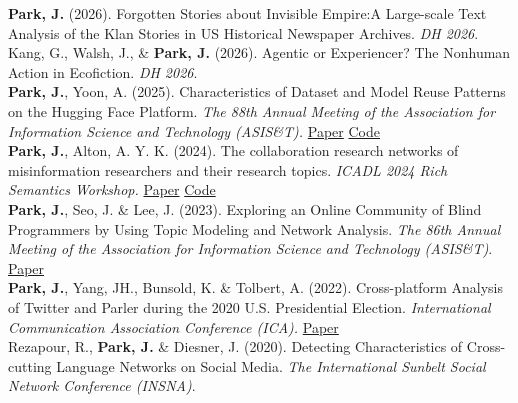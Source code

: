 \documentclass{article}
\begin{document}
\noindent \textbf{Park, J.} (2026). Forgotten Stories about Invisible Empire:A Large-scale Text Analysis of the Klan Stories in US Historical Newspaper Archives. \textit{DH 2026}.\\

\noindent Kang, G., Walsh, J., \& \textbf{Park, J.} (2026). Agentic or Experiencer? The Nonhuman Action in Ecofiction. \textit{DH 2026}. \\

\noindent \textbf{Park, J.}, Yoon, A. (2025). Characteristics of Dataset and Model Reuse Patterns on the Hugging Face Platform. \textit{The 88th Annual Meeting of the Association for Information Science and Technology (ASIS\&T).} \hfill \href{https://doi.org/10.1002/pra2.1490}{Paper} \href{https://github.com/park-jay/huggingface-models}{Code}\\

\noindent \textbf{Park, J.}, Alton, A. Y. K. (2024). The collaboration research networks of misinformation researchers and their research topics. \textit{ICADL 2024 Rich Semantics Workshop.} \hfill \href{https://dr.ntu.edu.sg/entities/publication/de887085-b76c-4372-8c7e-7754da8e19a7}{Paper} \href{https://github.com/park-jay/bibliometric-misinfo}{Code} \\


\noindent \textbf{Park, J.}, Seo, J. \& Lee, J. (2023). Exploring an Online Community of Blind Programmers by Using Topic Modeling and Network Analysis. \textit{The 86th Annual Meeting of the Association for Information Science and Technology (ASIS\&T)}. \hfill \href{https://doi.org/10.1002/pra2.956}{Paper} \\

\noindent \textbf{Park, J.}, Yang, JH., Bunsold, K. \& Tolbert, A. (2022). Cross-platform Analysis of Twitter and Parler during the 2020 U.S. Presidential Election. \textit{International Communication Association Conference (ICA).} \hfill \href{https://www.ideals.illinois.edu/items/121292}{Paper} \\ 

\noindent Rezapour, R., \textbf{Park, J.} \& Diesner, J. (2020). Detecting Characteristics of Cross-cutting Language Networks on Social Media. \textit{The International Sunbelt Social Network Conference (INSNA)}. \\
\end{document}
